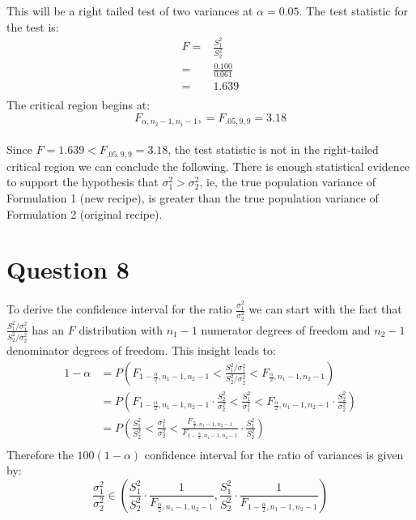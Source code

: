 \documentclass{article}
\begin{document}
This will be a right tailed test of two variances at $\alpha = 0.05$.
The test statistic for the test is:
\begin{align*}
  F = & \frac{S_1^2}{S_2^2} \\
    = & \frac{0.100}{0.061} \\
    = & 1.639 \\
\end{align*}
The critical region begins at:
\begin{equation*}
F_{\alpha , n_2-1, n_1-1},  = F_{.05 , 9, 9} = 3.18
\end{equation*}\\

Since $ F = 1.639 <  F_{.05 , 9, 9} = 3.18$, the test statistic is not in the right-tailed critical region
we can conclude the following.
There is enough statistical evidence to support the hypothesis that $\sigma_1^2 > \sigma_2^2$, ie,
the true
population variance of Formulation 1 (new recipe),
is greater than the true population variance of Formulation 2 (original recipe).

\clearpage
\section*{Question 8}
To derive the confidence interval for the ratio $\frac{\sigma_1^2}{\sigma_2^2}$ we can start with the fact that
$\frac{S_1^2 / \sigma_1^2}{S_2^2 / \sigma_2^2}$
has an $F$ distribution with $n_1 - 1$ numerator
degrees of freedom and $n_2 - 1$ denominator degrees of freedom. This insight leads to:
\begin{align*}
1 - \alpha  & = P\left( F_{1 - \frac{\alpha}{2}, n_1 - 1, n_2 - 1} < \frac{S_1^2 / \sigma_1^2}{S_2^2 / \sigma_2^2} < F_{\frac{\alpha}{2}, n_1 - 1, n_2 - 1} \right) \\
            & = P\left( F_{1 - \frac{\alpha}{2}, n_1 - 1, n_2 - 1} \cdot \frac{S_2^2}{\sigma_2^2} < \frac{S_1^2}{\sigma_1^2} < F_{\frac{\alpha}{2}, n_1 - 1, n_2 - 1} \cdot \frac{S_2^2}{\sigma_2^2} \right) \\
            & = P\left( \frac{S_1^2}{S_2^2} < \frac{\sigma_1^2}{\sigma_2^2} < \frac{F_{\frac{\alpha}{2}, n_1 - 1, n_2 - 1}}{F_{1 - \frac{\alpha}{2}, n_1 - 1, n_2 - 1}} \cdot \frac{S_1^2}{S_2^2} \right) \\
\end{align*}
Therefore the $100(1-\alpha)$ confidence interval for the ratio of variances is given by:
\begin{equation*}
  \frac{\sigma_1^2}{\sigma_2^2} \in \left( \frac{S_1^2}{S_2^2} \cdot \frac{1}{F_{\frac{\alpha}{2}, n_1 - 1, n_2 - 1}}, \frac{S_1^2}{S_2^2} \cdot \frac{1}{F_{1 - \frac{\alpha}{2}, n_1 - 1, n_2 - 1}} \right)
  \end{equation*}\\
\end{document}
